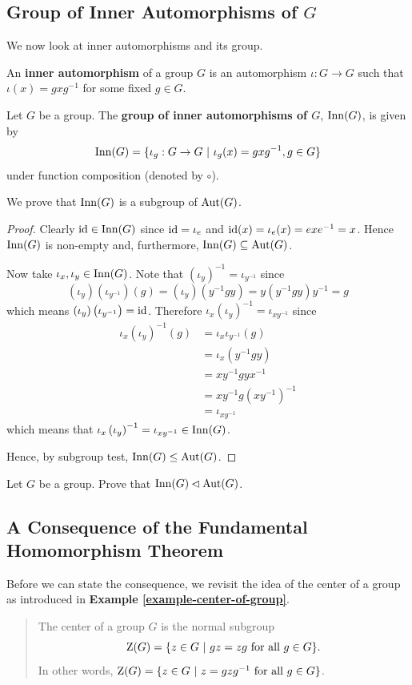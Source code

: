 \subsection{Group of Inner Automorphisms of \texorpdfstring{$G$}{G}}
We now look at inner automorphisms and its group.
\begin{definition}
    An \textbf{inner automorphism} of a group $G$ is an automorphism $\iota: G \to G$ such that $\iota(x) = gxg^{-1}$ for some fixed $g \in G$.
\end{definition}
\begin{definition}
    Let $G$ be a group. The \textbf{group of inner automorphisms of $G$}, $\mathrm{Inn}(G)$, is given by
    \[
        \mathrm{Inn}(G) = \{\iota_g: G \to G \ | \ \iota_g(x) = gxg^{-1}, g \in G\}
    \]
    under function composition (denoted by $\circ$).
\end{definition}
We prove that $\mathrm{Inn}(G)$ is a subgroup of $\mathrm{Aut}(G)$.
\begin{proof}
    Clearly $\mathrm{id} \in \mathrm{Inn}(G)$ since $\mathrm{id} = \iota_e$ and $\mathrm{id}(x) = \iota_e(x) = exe^{-1} = x$. Hence $\mathrm{Inn}(G)$ is non-empty and, furthermore, $\mathrm{Inn}(G) \subseteq \mathrm{Aut}(G)$.

    Now take $\iota_x, \iota_y \in \mathrm{Inn}(G)$. Note that $\left(\iota_y\right)^{-1} = \iota_{y^{-1}}$ since
    \[
        \left(\iota_y\right)\left(\iota_{y^{-1}}\right)(g) = \left(\iota_y\right)\left(y^{-1}gy\right) = y\left(y^{-1}gy\right)y^{-1} = g
    \]
    which means $\left(\iota_y\right)\left(\iota_{y^{-1}}\right) = \mathrm{id}$. Therefore $\iota_x\left(\iota_y\right)^{-1} = \iota_{xy^{-1}}$ since
    \begin{align*}
        \iota_x\left(\iota_y\right)^{-1}(g) &= \iota_x\iota_{y^{-1}}(g)\\
        &= \iota_x\left(y^{-1}gy\right)\\
        &= xy^{-1}gyx^{-1}\\
        &= xy^{-1}g(xy^{-1})^{-1}\\
        &= \iota_{xy^{-1}}
    \end{align*}
    which means that $\iota_x\left(\iota_y\right)^{-1} = \iota_{xy^{-1}} \in \mathrm{Inn}(G)$.

    Hence, by subgroup test, $\mathrm{Inn}(G) \leq \mathrm{Aut}(G)$.
\end{proof}

\begin{exercise}
    Let $G$ be a group. Prove that $\mathrm{Inn}(G) \lhd \mathrm{Aut}(G)$.
\end{exercise}

\subsection{A Consequence of the Fundamental Homomorphism Theorem}
Before we can state the consequence, we revisit the idea of the center of a group as introduced in \textbf{Example \ref{example-center-of-group}}.
\begin{quote}
    The center of a group $G$ is the normal subgroup
    \[
        \Z{G} = \{z \in G \ | \ gz = zg \text{ for all } g \in G\}.
    \]
    In other words, $\mathrm{Z}(G) = \{z \in G \ | \ z = gzg^{-1} \text{ for all } g \in G\}$.
\end{quote}

